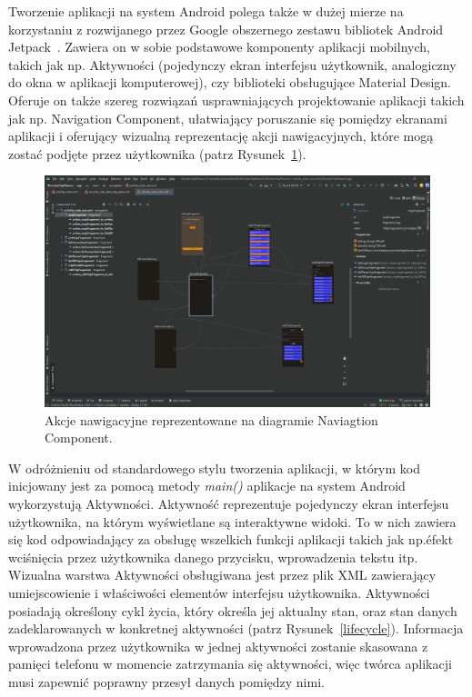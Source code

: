     Tworzenie aplikacji na system Android polega także w dużej mierze na korzystaniu z rozwijanego przez Google obszernego zestawu bibliotek Android Jetpack~\cite{JETPACK}. Zawiera on w sobie podstawowe 
    komponenty aplikacji mobilnych, takich jak np. Aktywności (pojedynczy ekran interfejsu użytkownik, analogiczny do okna w aplikacji komputerowej), czy biblioteki obsługujące Material Design. Oferuje 
    on także szereg rozwiązań usprawniających projektowanie aplikacji takich jak np. Navigation Component, ułatwiający poruszanie się pomiędzy ekranami aplikacji i oferujący wizualną reprezentację akcji 
    nawigacyjnych, które mogą zostać podjęte przez użytkownika (patrz Rysunek~\ref{jetpack}).

    \vspace{1cm}
    \begin{figure}[!ht]%
        \centering
        \includegraphics[scale=0.35]{src/jetpack_nav.png}
        \caption{Akcje nawigacyjne reprezentowane na diagramie Naviagtion Component.\label{jetpack}}
        \qquad
    \end{figure} 
    \vspace{1cm}

    W odróżnieniu od standardowego stylu tworzenia aplikacji, w którym kod inicjowany jest za pomocą metody \emph{main\!()} aplikacje na system Android wykorzystują Aktywności. Aktywność reprezentuje 
    pojedynczy ekran interfejsu użytkownika, na którym wyświetlane są interaktywne widoki. To w nich zawiera się kod odpowiadający za obsługę wszelkich funkcji aplikacji takich jak np.\' efekt wciśnięcia
    przez użytkownika danego przycisku, wprowadzenia tekstu itp. Wizualna warstwa Aktywności obsługiwana jest przez plik XML zawierający umiejscowienie i właściwości elementów interfejsu użytkownika.
    Aktywności posiadają określony cykl życia, który określa jej aktualny stan, oraz stan danych zadeklarowanych w konkretnej aktywności (patrz Rysunek~\ref{lifecycle}). Informacja wprowadzona przez 
    użytkownika w jednej aktywności zostanie skasowana z pamięci telefonu w momencie zatrzymania się aktywności, więc twórca aplikacji musi zapewnić poprawny przesył danych pomiędzy nimi. 

